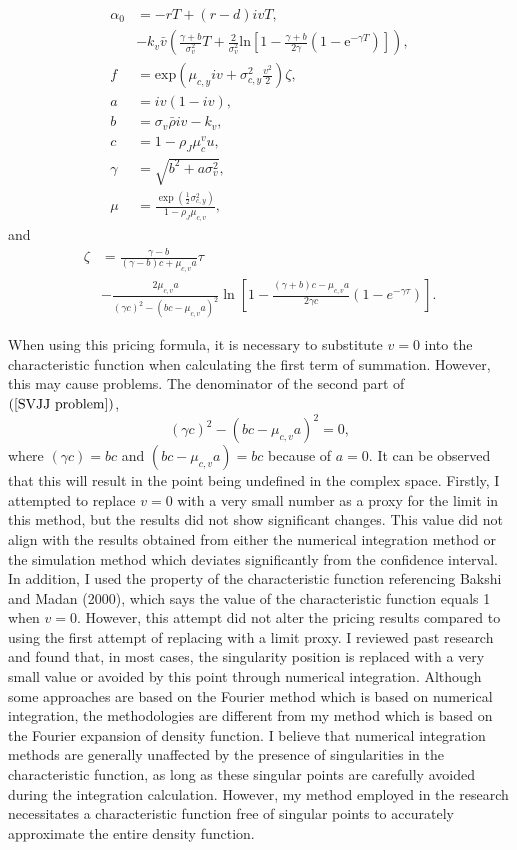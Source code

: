 \begin{align*}
\alpha_0 &= -rT + \left(r - d\right)i v T, \\
&-k_v\bar{v}\left(\frac{\gamma + b}{\sigma_v^2}T +\frac{2}{\sigma_v^2}\mathrm{ln}\left[1-\frac{\gamma+b}{2\gamma}\left(1-\mathrm{e}^{-\gamma T}\right)\right]\right),\\
f &= \mathrm{exp}\left(\mu_{c,y} i v+\sigma_{c,y}^2\frac{v^2}{2}\right)\zeta, \\
a &= iv\left(1-iv\right),\\ 
b &= \sigma_v \bar{\rho} iv - k_v,\\
c &= 1 - \rho_J\mu_c^v u,\\ 
\gamma &= \sqrt{b^2 + a \sigma_v^2},\\ 
\mu &=\frac{\exp \left(\frac{1}{2} \sigma_{c, y}^2\right)}{1-\rho_J \mu_{c, v}},
\end{align*}
and
\begin{align}
\zeta &= \frac{\gamma-b}{(\gamma-b) c+\mu_{c, v} a} \tau \nonumber \\
&-\frac{2 \mu_{c, v} a}{(\gamma c)^2-\left(b c-\mu_{c, v} a\right)^2} \ln \left[1-\frac{(\gamma+b) c- \mu_{c, v} a}{2 \gamma c}\left(1-e^{-\gamma \tau}\right)\right]. \label{SVJJ problem}
\end{align}

When using this pricing formula, it is necessary to substitute $v=0$ into the characteristic function when calculating the first term of summation. However, this may cause problems. The denominator of the second part of $(\ref{SVJJ problem})$,
$$(\gamma c)^2-\left(b c-\mu_{c, v} a\right)^2 = 0,$$
where $\left(\gamma c\right)=bc$ and $\left(bc - \mu_{c,v}a\right)=bc$ because of $a=0$. It can be observed that this will result in the point being undefined in the complex space. Firstly, I attempted to replace $v=0$ with a very small number as a proxy for the limit in this method, but the results did not show significant changes. This value did not align with the results obtained from either the numerical integration method or the simulation method which deviates significantly from the confidence interval. In addition, I used the property of the characteristic function referencing Bakshi and Madan (2000), which says the value of the characteristic function equals 1 when $v=0$. However, this attempt did not alter the pricing results compared to using the first attempt of replacing with a limit proxy. I reviewed past research and found that, in most cases, the singularity position is replaced with a very small value or avoided by this point through numerical integration. Although some approaches are based on the Fourier method which is based on numerical integration, the methodologies are different from my method which is based on the Fourier expansion of density function. I believe that numerical integration methods are generally unaffected by the presence of singularities in the characteristic function, as long as these singular points are carefully avoided during the integration calculation. However, my method employed in the research necessitates a characteristic function free of singular points to accurately approximate the entire density function.\\
